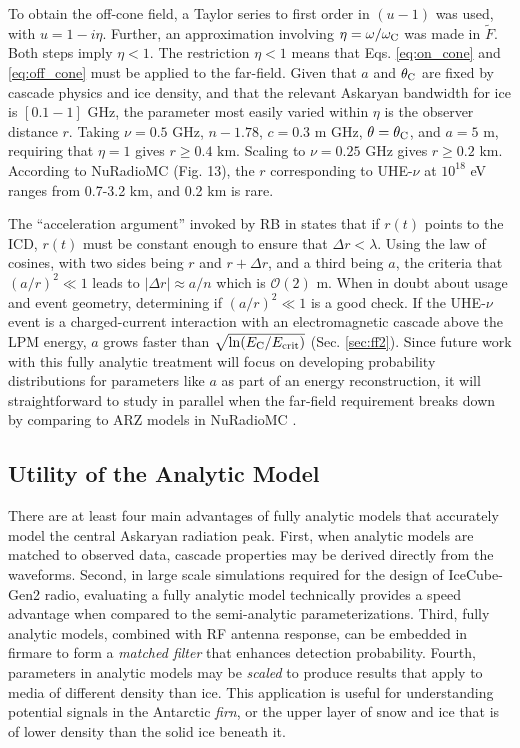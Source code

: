 \documentclass[amsmath,amssymb,aps,prd,10pt,twocolumn]{revtex4}
\begin{document}
To obtain the off-cone field, a Taylor series to first order in $(u-1)$ was used, with $u = 1-i\eta$.  Further, an approximation involving $\eta = \omega/\omega_{\rm C}$ was made in $\widetilde{F}$.  Both steps imply $\eta < 1$.  The restriction $\eta < 1$ means that Eqs. \ref{eq:on_cone} and \ref{eq:off_cone} must be applied to the far-field.  Given that $a$ and $\theta_{\rm C}$ are fixed by cascade physics and ice density, and that the relevant Askaryan bandwidth for ice is $[0.1-1]$ GHz, the parameter most easily varied within $\eta$ is the observer distance $r$.  Taking $\nu = 0.5$ GHz, $n - 1.78$, $c = 0.3$ m GHz, $\theta = \theta_{\rm C}$, and $a = 5$ m, requiring that $\eta = 1$ gives $r \geq 0.4$ km.  Scaling to $\nu = 0.25$ GHz gives $r \geq 0.2$ km.  According to NuRadioMC \cite{10.1140/epjc/s10052-020-7612-8} (Fig. 13), the $r$ corresponding to UHE-$\nu$ at $10^{18}$ eV ranges from 0.7-3.2 km, and 0.2 km is rare.

The ``acceleration argument'' invoked by RB in \cite{10.1103/physrevd.65.016003} states that if $r(t)$ points to the ICD, $r(t)$ must be constant enough to ensure that $\Delta r < \lambda$.  Using the law of cosines, with two sides being $r$ and $r+\Delta r$, and a third being $a$, the criteria that $(a/r)^2 \ll 1$ leads to $|\Delta r| \approx a/n$ which is $\mathcal{O}(2)$ m.  When in doubt about usage and event geometry, determining if $(a/r)^2 \ll 1$ is a good check.  If the UHE-$\nu$ event is a charged-current interaction with an electromagnetic cascade above the LPM energy, $a$ grows faster than $\sqrt{\ln(E_{\rm C}/E_{\rm crit})}$ (Sec. \ref{sec:ff2}).  Since future work with this fully analytic treatment will focus on developing probability distributions for parameters like $a$ as part of an energy reconstruction, it will straightforward to study in parallel when the far-field requirement breaks down by comparing to ARZ models in NuRadioMC \cite{10.1140/epjc/s10052-020-7612-8}.

\subsection{Utility of the Analytic Model}

There are at least four main advantages of fully analytic models that accurately model the central Askaryan radiation peak.  First, when analytic models are matched to observed data, cascade properties may be derived directly from the waveforms.  Second, in large scale simulations required for the design of IceCube-Gen2 radio, evaluating a fully analytic model technically provides a speed advantage when compared to the semi-analytic parameterizations.  Third, fully analytic models, combined with RF antenna response, can be embedded in firmare to form a \textit{matched filter} that enhances detection probability.  Fourth, parameters in analytic models may be \textit{scaled} to produce results that apply to media of different density than ice.  This application is useful for understanding potential signals in the Antarctic \textit{firn}, or the upper layer of snow and ice that is of lower density than the solid ice beneath it.
\end{document}
